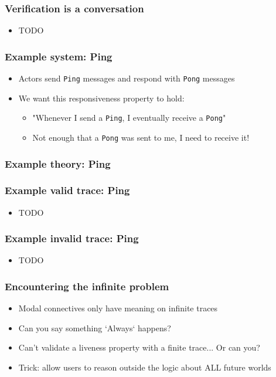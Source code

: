 \documentclass[aspectratio=169]{beamer}
\begin{document}
\begin{frame}
\frametitle{Verification is a conversation}
\begin{itemize}
  \item TODO
\end{itemize}
\end{frame}

\begin{frame}
\frametitle{Example system: Ping}
\begin{itemize}
  \item Actors send \texttt{Ping} messages and respond with \texttt{Pong} messages
  \item We want this responsiveness property to hold:
  \begin{itemize}
    \item "Whenever I send a \texttt{Ping}, I eventually receive a \texttt{Pong}"
    \item Not enough that a \texttt{Pong} was sent to me, I need to receive it!
  \end{itemize}
\end{itemize}
\end{frame}

\begin{frame}
\frametitle{Example theory: Ping}
  
\end{frame}

\begin{frame}
\frametitle{Example valid trace: Ping}
\begin{itemize}
  \item TODO
\end{itemize}
\end{frame}

\begin{frame}
\frametitle{Example invalid trace: Ping}
\begin{itemize}
  \item TODO
\end{itemize}
\end{frame}

\begin{frame}
\frametitle{Encountering the infinite problem}
\begin{itemize}
  \item Modal connectives only have meaning on infinite traces
  \item Can you say something `Always` happens?
  \item Can't validate a liveness property with a finite trace... Or can you?
  \item Trick: allow users to reason outside the logic about ALL future worlds
\end{itemize}
\end{frame}
\end{document}
